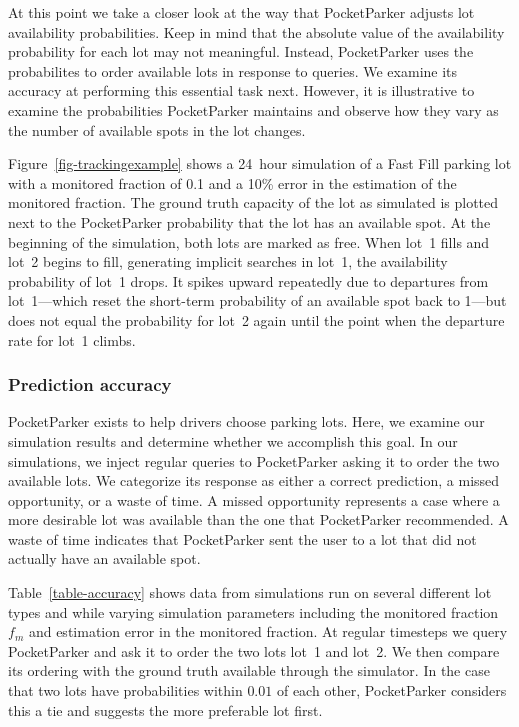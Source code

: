 At this point we take a closer look at the way that PocketParker adjusts lot
availability probabilities. Keep in mind that the absolute value of the
availability probability for each lot may not meaningful. Instead,
PocketParker uses the probabilites to order available lots in response to
queries. We examine its accuracy at performing this essential task next.
However, it is illustrative to examine the probabilities PocketParker
maintains and observe how they vary as the number of available spots in the
lot changes.

Figure~\ref{fig-trackingexample} shows a 24~hour simulation of a Fast Fill
parking lot with a monitored fraction of 0.1 and a 10\% error in the
estimation of the monitored fraction. The ground truth capacity of the lot as
simulated is plotted next to the PocketParker probability that the lot has an
available spot. At the beginning of the simulation, both lots are marked as
free. When lot~1 fills and lot~2 begins to fill, generating implicit searches
in lot~1, the availability probability of lot~1 drops. It spikes upward
repeatedly due to departures from lot~1---which reset the short-term
probability of an available spot back to 1---but does not equal the
probability for lot~2 again until the point when the departure rate for lot~1
climbs.

\subsubsection{Prediction accuracy}



PocketParker exists to help drivers choose parking lots. Here, we examine our
simulation results and determine whether we accomplish this goal. In our
simulations, we inject regular queries to PocketParker asking it to order the
two available lots. We categorize its response as either a correct
prediction, a missed opportunity, or a waste of time. A missed opportunity
represents a case where a more desirable lot was available than the one that
PocketParker recommended. A waste of time indicates that PocketParker sent
the user to a lot that did not actually have an available spot.

Table~\ref{table-accuracy} shows data from simulations run on several
different lot types and while varying simulation parameters including the
monitored fraction $f_m$ and estimation error in the monitored fraction. At
regular timesteps we query PocketParker and ask it to order the two lots
lot~1 and lot~2. We then compare its ordering with the ground truth available
through the simulator. In the case that two lots have probabilities within
$0.01$ of each other, PocketParker considers this a tie and suggests the more
preferable lot first.

